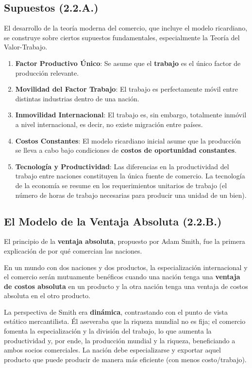 \subsection{Supuestos (2.2.A.)}
El desarrollo de la teoría moderna del comercio, que incluye el modelo ricardiano, se construye sobre ciertos supuestos fundamentales, especialmente la Teoría del Valor-Trabajo.

\begin{enumerate}
    \item \textbf{Factor Productivo Único}: Se asume que el \textbf{trabajo} es el único factor de producción relevante.
    \item \textbf{Movilidad del Factor Trabajo}: El trabajo es perfectamente móvil entre distintas industrias dentro de una nación.
    \item \textbf{Inmovilidad Internacional}: El trabajo es, sin embargo, totalmente inmóvil a nivel internacional, es decir, no existe migración entre países.
    \item \textbf{Costos Constantes}: El modelo ricardiano inicial asume que la producción se lleva a cabo bajo condiciones de \textbf{costos de oportunidad constantes}.
    \item \textbf{Tecnología y Productividad}: Las diferencias en la productividad del trabajo entre naciones constituyen la única fuente de comercio. La tecnología de la economía se resume en los requerimientos unitarios de trabajo (el número de horas de trabajo necesarias para producir una unidad de un bien).
\end{enumerate}

\subsection{El Modelo de la Ventaja Absoluta (2.2.B.)}
El principio de la \textbf{ventaja absoluta}, propuesto por Adam Smith, fue la primera explicación de por qué comercian las naciones.

\begin{definicion}
En un mundo con dos naciones y dos productos, la especialización internacional y el comercio serán mutuamente benéficos cuando una nación tenga una \textbf{ventaja de costos absoluta} en un producto y la otra nación tenga una ventaja de costos absoluta en el otro producto.
\end{definicion}

La perspectiva de Smith era \textbf{dinámica}, contrastando con el punto de vista estático mercantilista. Él aseveraba que la riqueza mundial no es fija; el comercio fomenta la especialización y la división del trabajo, lo que aumenta la productividad y, por ende, la producción mundial y la riqueza, beneficiando a ambos socios comerciales. La nación debe especializarse y exportar aquel producto que puede producir de manera más eficiente (con menos costo/trabajo).

